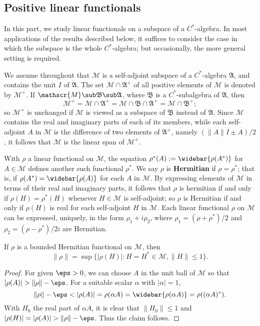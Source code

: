 \subsection{Positive linear functionals}
In this part, we study linear functionals on a subspace of a $C^*$-algebra. In most applications of the results described below, it suffices to consider the case in which the subspace is the whole $C^*$-algebra; but occasionally, the more general setting is required.\par
We assume throughout that $\mathscr{M}$ is a self-adjoint subspace of a $C^*$-algebra $\mathfrak{A}$, and contains the unit $I$ of $\mathfrak{A}$. The set $\mathscr{M}\cap\mathfrak{A}^+$ of all positive elements of $\mathscr{M}$ is denoted by $\mathscr{M}^+$. If $\mathscr{M}\sub\mathfrak{B}\sub\mathfrak{A}$, where $\mathfrak{B}$ is a $C^*$-subalgebra of $\mathfrak{A}$, then
\[\mathscr{M}^+=\mathscr{M}\cap\mathfrak{A}^+=\mathscr{M}\cap\mathfrak{B}\cap\mathfrak{A}^+=\mathscr{M}\cap\mathfrak{B}^+;\]
so $\mathscr{M}^+$ is unchanged if $\mathscr{M}$ is viewed as a subspace of $\mathfrak{B}$ instead of $\mathfrak{A}$. Since $\mathscr{M}$ contains the real and imaginary parts of each of its members, while each self-adjoint $A$ in $\mathscr{M}$ is the difference of two elements of $\mathfrak{A}^+$, namely $(\|A\|I\pm A)/2$, it follows that $\mathscr{M}$ is the linear span of $\mathscr{M}^+$.\par
With $\rho$ a linear functional on $\mathscr{M}$, the equation $\rho^*(A):=\widebar{\rho(A^*)}$ for $A\in\mathscr{M}$ defines another such functional $\rho^*$. We say $\rho$ is \textbf{Hermitian} if $\rho=\rho^*$; that is, if $\rho(A^*)=\widebar{\rho(A)}$ for each $A$ in $\mathscr{M}$. By expressing elements of $\mathscr{M}$ in terms of their real and imaginary parts, it follows that $\rho$ is hermitian if and only if $\rho(H)=\rho^*(H)$ whenever $H\in\mathscr{M}$ is self-adjoint; so $\rho$ is Hermitian if and only if $\rho(H)$ is real for each self-adjoint $H$ in $\mathscr{M}$. Each linear functional $\rho$ on $\mathscr{M}$ can be expressed, uniquely, in the form $\rho_1+i\rho_2$, where $\rho_1=(\rho+\rho^*)/2$ and $\rho_2=(\rho-\rho^*)/2i$ are Hermitian.
\begin{proposition}\label{C^* algebra bounded Hermitian functional norm}
If $\rho$ is a bounded Hermitian functional on $\mathscr{M}$, then
\[\|\rho\|=\sup\{|\rho(H)|:H=H^*\in\mathscr{M},\|H\|\leq 1\}.\]
\end{proposition}
\begin{proof}
For given $\eps>0$, we can choose $A$ in the unit ball of $\mathscr{M}$ so that $|\rho(A)|>\|\rho\|-\eps$. For a suitable scalar $\alpha$ with $|\alpha|=1$,
\[\|\rho\|-\eps<|\rho(A)|=\rho(\alpha A)=\widebar{\rho(\alpha A)}=\rho((\alpha A)^*).\]
With $H_0$ the real part of $\alpha A$, it is clear that $\|H_0\|\leq 1$ and $|\rho(H)|=|\rho(A)|>\|\rho\|-\eps$. Thus the claim follows.
\end{proof}
